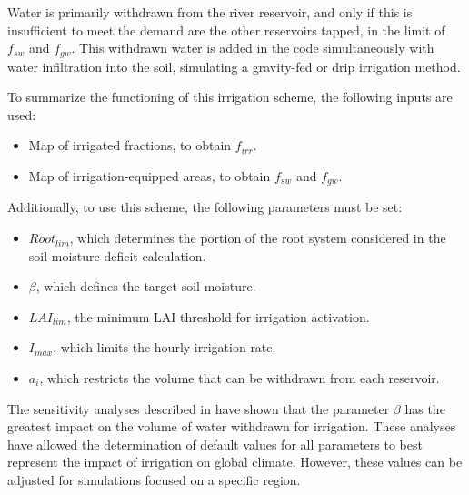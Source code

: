 Water is primarily withdrawn from the river reservoir, and only if this is insufficient to meet the demand are the other reservoirs tapped, in the limit of $f_{sw}$ and $f_{gw}$.
This withdrawn water is added in the code simultaneously with water infiltration into the soil, simulating a gravity-fed or drip irrigation method.

\hfill

To summarize the functioning of this irrigation scheme, the following inputs are used:
\begin{itemize}
    \item Map of irrigated fractions, to obtain $f_{irr}$.
    \item Map of irrigation-equipped areas, to obtain $f_{sw}$ and $f_{gw}$.
\end{itemize}

Additionally, to use this scheme, the following parameters must be set:
\begin{itemize}
    \item $Root_{lim}$, which determines the portion of the root system considered in the soil moisture deficit calculation.
    \item $\beta$, which defines the target soil moisture.
    \item $LAI_{lim}$, the minimum LAI threshold for irrigation activation.
    \item $I_{max}$, which limits the hourly irrigation rate.
    \item $a_i$, which restricts the volume that can be withdrawn from each reservoir.
\end{itemize}

The sensitivity analyses described in \citet{arboleda-obando_validation_2024} have shown that the parameter $\beta$ has the greatest impact on the volume of water withdrawn for irrigation. These analyses have allowed the determination of default values for all parameters to best represent the impact of irrigation on global climate. However, these values can be adjusted for simulations focused on a specific region.
